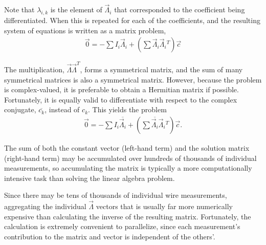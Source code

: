 \documentclass{article}
\begin{document}
Note that $\lambda_{i,k}$ is the element of $\vec{\Lambda}_i$ that corresponded to the coefficient being differentiated.  When this is repeated for each of the coefficients, and the resulting system of equations is written as a matrix problem,
\begin{align}
\vec{0} = -\sum I_i \vec{\Lambda}_i + \left(\sum \vec{\Lambda}_i \vec{\Lambda}_i{^T} \right) \vec{c}
\end{align}

The multiplication, $\vec{\Lambda} \vec{\Lambda}^T$, forms a symmetrical matrix, and the sum of many symmetrical matrices is also a symmetrical matrix.  However, because the problem is complex-valued, it is preferable to obtain a Hermitian matrix if possible.  Fortunately, it is equally valid to differentiate with respect to the complex conjugate, $\overline{c_k}$, instead of $c_k$.  This yields the problem
\begin{align}
\vec{0} = -\sum I_i \overline{\vec{\Lambda}_i}  + \left(\sum \overline{\vec{\Lambda}_i} \vec{\Lambda}_i{^T} \right) \vec{c}.
\end{align}

The sum of both the constant vector (left-hand term) and the solution matrix (right-hand term) may be accumulated over hundreds of thousands of individual measurements, so accumulating the matrix is typically a more computationally intensive task than solving the linear algebra problem.

Since there may be tens of thousands of individual wire measurements, aggregating the individual $\vec{\Lambda}$ vectors that is usually far more numerically expensive than calculating the inverse of the resulting matrix.  Fortunately, the calculation is extremely convenient to parallelize, since each measurement's contribution to the matrix and vector is independent of the others'.
\end{document}
